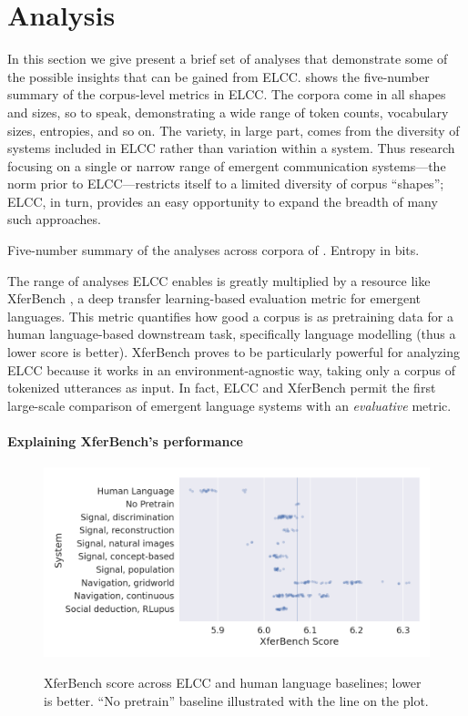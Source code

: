 \section{Analysis}
\unskip\label{elcc:sec:analysis}

In this section we give present a brief set of analyses that demonstrate some of the possible insights that can be gained from ELCC\@.
 shows the five-number summary of the corpus-level metrics in ELCC.
The corpora come in all shapes and sizes, so to speak, demonstrating a wide range of token counts, vocabulary sizes, entropies, and so on.
The variety, in large part, comes from the diversity of systems included in ELCC rather than variation within a system.
Thus research focusing on a single or narrow range of emergent communication systems---the norm prior to ELCC---restricts itself to a limited diversity of corpus ``shapes''; ELCC, in turn, provides an easy opportunity to expand the breadth of many such approaches.

\begin{table}
  \centering
  \medskip
  \caption{Five-number summary of the analyses across corpora of \theLib{}.  Entropy in bits.}
  \unskip\label{tab:quant-sum}
\end{table}

The range of analyses ELCC enables is greatly multiplied by a resource like XferBench \citep{xferbench}, a deep transfer learning-based evaluation metric for emergent languages.
This metric quantifies how good a corpus is as pretraining data for a human language-based downstream task, specifically language modelling (thus a lower score is better).
XferBench proves to be particularly powerful for analyzing ELCC because it works in an environment-agnostic way, taking only a corpus of tokenized utterances as input.
In fact, ELCC and XferBench permit the first large-scale comparison of emergent language systems with an \emph{evaluative} metric.


\paragraph{Explaining XferBench's performance}

\begin{figure}
  \centering
  \includegraphics[width=0.7\linewidth]{chapters/elcc/src/figure/generated/elcc-cat}
  \caption{XferBench score across ELCC and human language baselines; lower is better.  ``No pretrain'' baseline illustrated with the line on the plot.}
  \unskip\label{elcc:fig:elcc-cat}
\end{figure}


